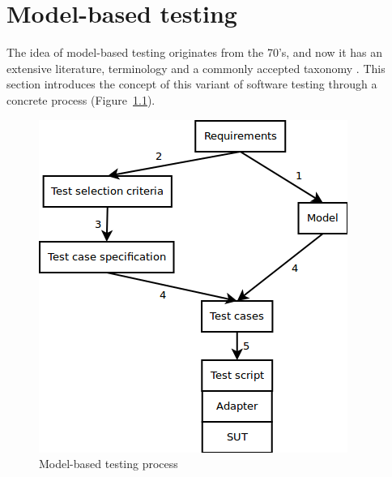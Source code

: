 \chapter{Model-based testing}
\label{cha:modelbasedtesting}

The idea of model-based testing originates from the 70's, and now it has an extensive literature, terminology and a commonly accepted taxonomy \cite{taxonomy}. This section introduces the concept of this variant of software testing through a concrete process (Figure~\ref{fig:mbtprocess}).

\begin{figure}[htp]
\centering
\includegraphics[scale=0.6]{figures/mbt_process.png}
\caption{Model-based testing process}
\label{fig:mbtprocess}
\end{figure}

